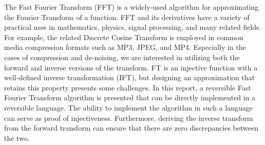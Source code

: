 The Fast Fourier Transform (FFT) is a widely-used algorithm for approximating the
Fourier Transform of a function.
FFT and its derivatives have a variety of practical uses in
mathematics, physics, signal processing, and many related fields.
For example,
the related Discrete Cosine Transform is employed in common media compression formats such as
MP3, JPEG, and MP4.
Especially in the cases of compression and de-noising,
we are interested in utilizing both the forward and inverse versions of the transform.
FT is an injective function with a well-defined inverse transformation (IFT),
but designing an approximation that retains this property presents some challenges.
%
In this report,
a reversible Fast Fourier Transform algorithm is presented
that can be directly implemented in a reversible language.
The ability to implement the algorithm in such a language can serve as proof of injectiveness.
Furthermore, deriving the inverse transform from the forward transform can ensure
that there are zero discrepancies between the two.

